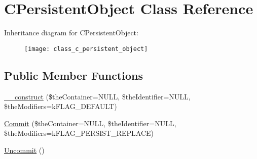 \hypertarget{class_c_persistent_object}{\section{C\-Persistent\-Object Class Reference}
\label{class_c_persistent_object}
}
Inheritance diagram for C\-Persistent\-Object\-:\begin{figure}[H]
\begin{center}
\leavevmode
\texttt{[image: class\_c\_persistent\_object]}
\end{center}
\end{figure}
\subsection*{Public Member Functions}
\begin{DoxyCompactItemize}
\item 
\hyperlink{class_c_persistent_object_a0f0729cfaef48bd1c98c0711c061a7d3}{\-\_\-\-\_\-construct} (\$the\-Container=N\-U\-L\-L, \$the\-Identifier=N\-U\-L\-L, \$the\-Modifiers=k\-F\-L\-A\-G\-\_\-\-D\-E\-F\-A\-U\-L\-T)
\item 
\hyperlink{class_c_persistent_object_a88b1f2b11d3d60e0b3d33d8b0649b68a}{Commit} (\$the\-Container=N\-U\-L\-L, \$the\-Identifier=N\-U\-L\-L, \$the\-Modifiers=k\-F\-L\-A\-G\-\_\-\-P\-E\-R\-S\-I\-S\-T\-\_\-\-R\-E\-P\-L\-A\-C\-E)
\item 
\hyperlink{class_c_persistent_object_a37c897b534e88477a06ec60b89d84450}{Uncommit} ()
\end{DoxyCompactItemize}

